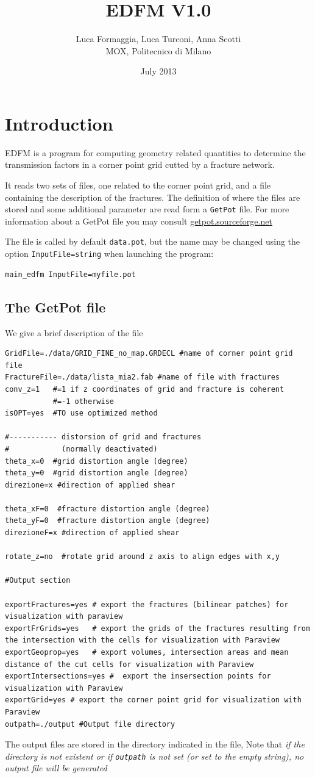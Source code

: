 \documentclass[12pt,twoside]{article}
\title{EDFM V1.0}
\author{Luca Formaggia, Luca Turconi, Anna Scotti\\MOX, Politecnico di Milano}
\date{July 2013}
\begin{document}
\maketitle
\section{Introduction}
EDFM is a program for computing geometry related quantities to determine the transmission factors in a corner point grid cutted by a fracture network.

It reads two sets of files, one related to the corner point grid, and a file containing the description of the fractures.
The definition of where the files are stored and some additional parameter are read form a \texttt{GetPot} file. For more information about a GetPot file
you may consult \href{getpot.sourceforge.net}{getpot.sourceforge.net}

The file is called by default \texttt{data.pot}, but the name may be changed using the option \texttt{InputFile=string} when launching the program:

\begin{verbatim}
main_edfm InputFile=myfile.pot
\end{verbatim}

\subsection{The GetPot file}
We give a brief description of the file 
\begin{verbatim}
GridFile=./data/GRID_FINE_no_map.GRDECL #name of corner point grid file
FractureFile=./data/lista_mia2.fab #name of file with fractures
conv_z=1   #=1 if z coordinates of grid and fracture is coherent
           #=-1 otherwise 
isOPT=yes  #TO use optimized method

#----------- distorsion of grid and fractures 
#            (normally deactivated)
theta_x=0  #grid distortion angle (degree)
theta_y=0  #grid distortion angle (degree)
direzione=x #direction of applied shear

theta_xF=0  #fracture distortion angle (degree)
theta_yF=0  #fracture distortion angle (degree)
direzioneF=x #direction of applied shear

rotate_z=no  #rotate grid around z axis to align edges with x,y

#Output section

exportFractures=yes # export the fractures (bilinear patches) for visualization with paraview
exportFrGrids=yes   # export the grids of the fractures resulting from the intersection with the cells for visualization with Paraview
exportGeoprop=yes   # export volumes, intersection areas and mean distance of the cut cells for visualization with Paraview
exportIntersections=yes #  export the insersection points for visualization with Paraview
exportGrid=yes # export the corner point grid for visualization with Paraview
outpath=./output #Output file directory
\end{verbatim}
The output files are stored in the directory indicated in the file, Note that \emph{if the directory is
not existent or if \texttt{outpath} is not set (or set to the empty string), no output file will be generated}
\end{document}
